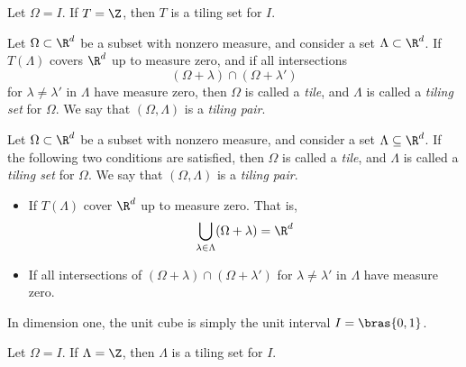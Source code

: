 \begin{theorem}  %
    Let $\Omega = I$. If $T=\Z$, then $T$ is a tiling set for $I$.
\end{theorem}


\begin{definition}
    Let $\Omega \subset \R^d$ be a subset with nonzero measure, and consider a set $\Lambda \subset \R^d$. If $T(\Lambda)$ covers $\R^d$ up to measure zero, and if all intersections 
    \begin{equation*}  %
        (\Omega+\lambda) \cap (\Omega+\lambda')
    \end{equation*}
    for $\lambda\neq \lambda'$ in $\Lambda$ have measure zero, then $\Omega$ is called a \emph{tile}, and $\Lambda$ is called a \emph{tiling set} for $\Omega$. We say that $(\Omega, \Lambda)$ is a \emph{tiling pair}. 
\end{definition}
\begin{definition}  %
    Let $\Omega \subset \R^d$ be a subset with nonzero measure, and consider a set $\Lambda \subseteq \R^d$. If the following two conditions are satisfied, then $\Omega$ is called a \emph{tile}, and $\Lambda$ is called a \emph{tiling set} for $\Omega$. We say that $(\Omega, \Lambda)$ is a \emph{tiling pair}. 
    \begin{itemize}
        \item If $T(\Lambda)$ cover $\R^d$ up to measure zero. That is,  %
        \begin{equation*}
            \bigcup_{\lambda \in \Lambda} (\Omega + \lambda) = \R^d
        \end{equation*}
        \item If all intersections of $(\Omega+\lambda) \cap (\Omega+\lambda')$ for $\lambda\neq \lambda'$ in $\Lambda$ have measure zero. %
    \end{itemize}
\end{definition}


In dimension one, the unit cube is simply the unit interval $I=\bras{0,1}$.
\begin{theorem}  %
    Let $\Omega = I$. If $\Lambda=\Z$, then $\Lambda$ is a tiling set for $I$.
\end{theorem}

